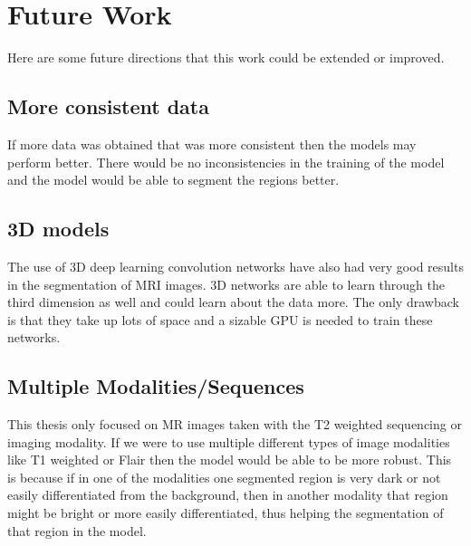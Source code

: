 \section{Future Work}
    Here are some future directions that this work could be extended or improved.
    
\subsection{More consistent data}
    If more data was obtained that was more consistent then the models may perform better.
    There would be no inconsistencies in the training of the model and the model would be able to segment the regions better.
    
\subsection{3D models}
    The use of 3D deep learning convolution networks have also had very good results in the segmentation of MRI images. 
    3D networks are able to learn through the third dimension as well and could learn about the data more.
    The only drawback is that they take up lots of space and a sizable GPU is needed to train these networks.
    
\subsection{Multiple Modalities/Sequences}
    This thesis only focused on MR images taken with the T2 weighted sequencing or imaging modality.
    If we were to use multiple different types of image modalities like T1 weighted or Flair then the model would be able to be more robust.
    This is because if in one of the modalities one segmented region is very dark or not easily differentiated from the background, then in another modality that region might be bright or more easily differentiated, thus helping the segmentation of that region in the model.